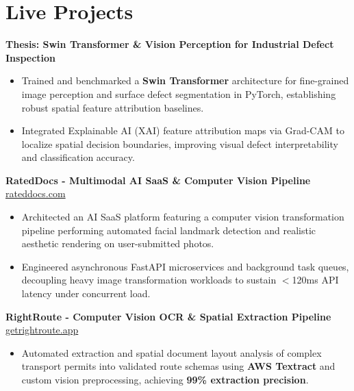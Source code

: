\documentclass[9.5pt,a4paper]{article}
\begin{document}
\section*{Live Projects}
\noindent
\textbf{Thesis: Swin Transformer \& Vision Perception for Industrial Defect Inspection}
\begin{itemize}
    \item Trained and benchmarked a \textbf{Swin Transformer} architecture for fine-grained image perception and surface defect segmentation in PyTorch, establishing robust spatial feature attribution baselines.
    \item Integrated Explainable AI (XAI) feature attribution maps via Grad-CAM to localize spatial decision boundaries, improving visual defect interpretability and classification accuracy.
\end{itemize}
\vspace{0.6pt}
\noindent
\textbf{RatedDocs - Multimodal AI SaaS \& Computer Vision Pipeline} \hfill \href{https://rateddocs.com}{rateddocs.com}
\begin{itemize}
    \item Architected an AI SaaS platform featuring a computer vision transformation pipeline performing automated facial landmark detection and realistic aesthetic rendering on user-submitted photos.
    \item Engineered asynchronous FastAPI microservices and background task queues, decoupling heavy image transformation workloads to sustain $<$120ms API latency under concurrent load.
\end{itemize}
\vspace{0.6pt}
\noindent
\textbf{RightRoute - Computer Vision OCR \& Spatial Extraction Pipeline} \hfill \href{https://getrightroute.app}{getrightroute.app}
\begin{itemize}
    \item Automated extraction and spatial document layout analysis of complex transport permits into validated route schemas using \textbf{AWS Textract} and custom vision preprocessing, achieving \textbf{99\% extraction precision}.
\end{itemize}
\vspace{0.6pt}
\end{document}
